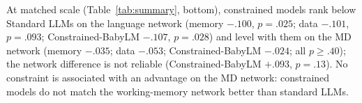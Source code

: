 At matched scale (Table~\ref{tab:summary}, bottom), constrained models rank below Standard LLMs on the language network (memory $-.100$, $p=.025$; data $-.101$, $p=.093$; Constrained-BabyLM $-.107$, $p=.028$) and level with them on the MD network (memory $-.035$; data $-.053$; Constrained-BabyLM $-.024$; all $p\geq.40$); the network difference is not reliable (Constrained-BabyLM $+.093$, $p=.13$). No constraint is associated with an advantage on the MD network: constrained models do not match the working-memory network better than standard LLMs.
